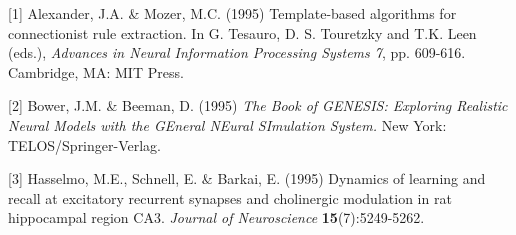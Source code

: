 \documentclass{article} %
\begin{document}
\begin{figure}[htp]
  \centering
  \quad
\end{figure}

\small{
[1] Alexander, J.A. \& Mozer, M.C. (1995) Template-based algorithms
for connectionist rule extraction. In G. Tesauro, D. S. Touretzky
and T.K. Leen (eds.), {\it Advances in Neural Information Processing
Systems 7}, pp. 609-616. Cambridge, MA: MIT Press.

[2] Bower, J.M. \& Beeman, D. (1995) {\it The Book of GENESIS: Exploring
Realistic Neural Models with the GEneral NEural SImulation System.}
New York: TELOS/Springer-Verlag.

[3] Hasselmo, M.E., Schnell, E. \& Barkai, E. (1995) Dynamics of learning
and recall at excitatory recurrent synapses and cholinergic modulation
in rat hippocampal region CA3. {\it Journal of Neuroscience}
{\bf 15}(7):5249-5262.
}
\end{document}
